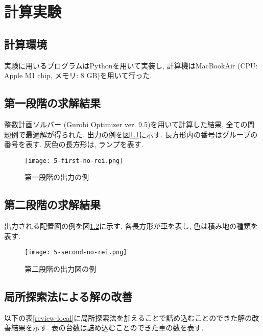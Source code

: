 \chapter{計算実験}\label{computational_result}
\section{計算環境}
実験に用いるプログラムはPythonを用いて実装し, 計算機はMacBookAir (CPU: Apple M1 chip, メモリ: 8 GB)を用いて行った. 

\section{第一段階の求解結果}
整数計画ソルバー (Gurobi Optimizer ver. 9.5)を用いて計算した結果, 全ての問題例で最適解が得られた. 
出力の例を図\ref{first-no-rei}に示す. 
長方形内の番号はグループの番号を表す. 
灰色の長方形は, ランプを表す. \\

\begin{figure}[b]
    \texttt{[image: 5-first-no-rei.png]}
    \caption{第一段階の出力の例}
    \label{first-no-rei}
\end{figure}
\clearpage

\section{第二段階の求解結果}
出力される配置図の例を図\ref{second-no-rei}に示す. 
各長方形が車を表し, 色は積み地の種類を表す. \\

\begin{figure}[b]
    \texttt{[image: 5-second-no-rei.png]}
    \caption{第二段階の出力図の例}
    \label{second-no-rei}
\end{figure}

\section{局所探索法による解の改善}
以下の表\ref{review-local}に局所探索法を加えることで詰め込むことのできた解の改善結果を示す. 
表の台数は詰め込むことのできた車の数を表す. 

